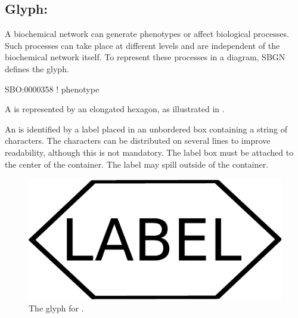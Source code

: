 \subsection{Glyph: }
\label{sec:af:phenotype}

A biochemical network can generate phenotypes or affect biological processes. Such processes can take place at different levels and are independent of the biochemical network itself. To represent these processes in a diagram, SBGN defines the  glyph.

\begin{glyphDescription}

\glyphSboTerm
SBO:0000358 ! phenotype

\glyphContainer A  is represented by an elongated hexagon, as illustrated in .

\glyphLabel An  is identified by a label placed in an unbordered box containing a string of characters.  The characters can be distributed on several lines to improve readability, although this is not mandatory.  The label box must be attached to the center of the  container.  The label may spill outside of the container.

\end{glyphDescription}

\begin{figure}[H]
  \centering
  \includegraphics[scale = 0.4]{images/phenotype}
  \caption{The \AF glyph for .}
  \label{fig:af:phenotype}
\end{figure}
